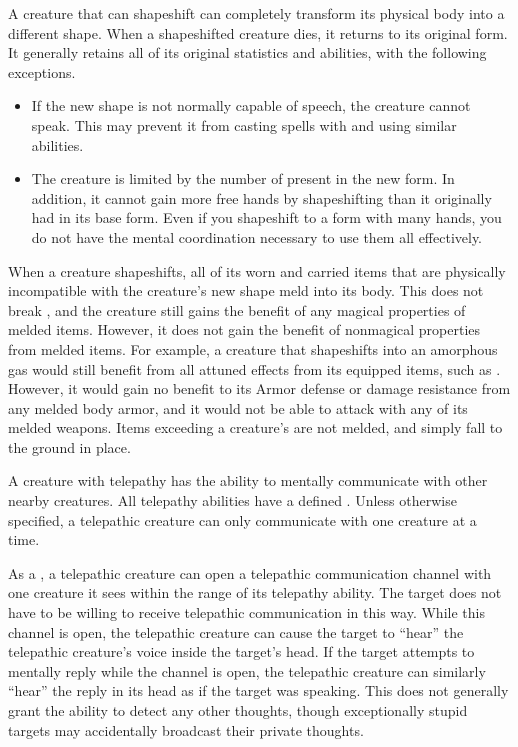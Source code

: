         A creature that can shapeshift can completely transform its physical body into a different shape.
        When a shapeshifted creature dies, it returns to its original form.
        It generally retains all of its original statistics and abilities, with the following exceptions.
        \begin{itemize}
            \item If the new shape is not normally capable of speech, the creature cannot speak.
                This may prevent it from casting spells with  and using similar abilities.
            \item The creature is limited by the number of  present in the new form.
                In addition, it cannot gain more free hands by shapeshifting than it originally had in its base form.
                Even if you shapeshift to a form with many hands, you do not have the mental coordination necessary to use them all effectively.
        \end{itemize}

        When a creature shapeshifts, all of its worn and carried items that are physically incompatible with the creature's new shape meld into its body.
        This does not break , and the creature still gains the benefit of any magical properties of melded items.
        However, it does not gain the benefit of nonmagical properties from melded items.
        For example, a creature that shapeshifts into an amorphous gas would still benefit from all attuned effects from its equipped items, such as .
        However, it would gain no benefit to its Armor defense or damage resistance from any melded body armor, and it would not be able to attack with any of its melded weapons.
        Items exceeding a creature's  are not melded, and simply fall to the ground in place.

        A creature with telepathy has the ability to mentally communicate with other nearby creatures.
        All telepathy abilities have a defined .
        Unless otherwise specified, a telepathic creature can only communicate with one creature at a time.

        As a , a telepathic creature can open a telepathic communication channel with one creature it sees within the range of its telepathy ability.
        The target does not have to be willing to receive telepathic communication in this way.
        While this channel is open, the telepathic creature can cause the target to ``hear'' the telepathic creature's voice inside the target's head.
        If the target attempts to mentally reply while the channel is open, the telepathic creature can similarly ``hear'' the reply in its head as if the target was speaking.
        This does not generally grant the ability to detect any other thoughts, though exceptionally stupid targets may accidentally broadcast their private thoughts.


